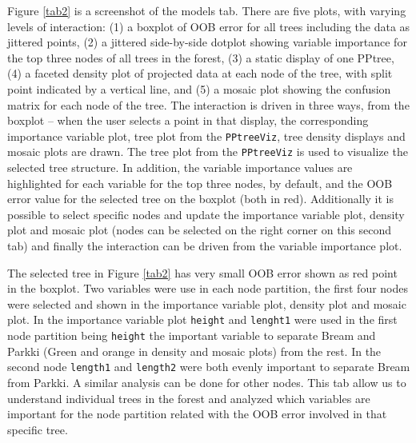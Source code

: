 \documentclass[smallextended,natbib]{svjour3}\usepackage[]{graphicx}\usepackage[]{xcolor}
\begin{document}
Figure \ref{tab2} is a screenshot of the models tab. There are five plots, with varying levels of interaction: (1) a boxplot of OOB error for all trees including the data as jittered points, (2) a jittered side-by-side dotplot showing variable importance for the top three nodes of all trees in the forest, (3) a static display of one PPtree, (4) a faceted density plot of projected data at each node of the tree, with split point indicated by a vertical line, and (5) a mosaic plot showing the confusion matrix for each node of the tree.  The interaction is driven in three ways, from the boxplot -- when the user selects a point in that display, the corresponding importance variable plot, tree plot from the \verb#PPtreeViz#, tree density displays and mosaic plots are drawn. The tree plot from the \verb#PPtreeViz# is used to visualize the selected tree structure. In addition, the variable importance values are highlighted for each variable for the top three nodes, by default, and the OOB error value for the selected tree on the boxplot (both in red).
Additionally it is possible to select specific nodes and update the importance variable plot, density plot and mosaic plot (nodes can be selected on the right corner on this second tab) and finally the interaction can be driven from the variable importance plot.

The selected tree in Figure \ref{tab2} has very small OOB error shown as red point in the boxplot. Two variables were use in each node partition, the first four nodes were selected and shown in the importance variable plot, density plot and mosaic plot. In the importance variable plot \verb#height# and \verb#lenght1# were used in the first node partition being \verb#height# the important variable to separate Bream and Parkki (Green and orange in density and mosaic plots) from the rest. In the second node \verb#length1# and \verb#length2# were both evenly important  to separate Bream from Parkki. A similar analysis can be done for other nodes. This tab allow us to understand individual trees in the forest and analyzed which variables are important for the node partition related with the OOB error involved in that specific tree.
\end{document}
